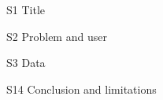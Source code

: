 \begin{frame}{S1 Title}
\end{frame}

\begin{frame}{S2 Problem and user}
\end{frame}

\begin{frame}{S3 Data}
\end{frame}

\begin{frame}{S14 Conclusion and limitations}
\end{frame}

